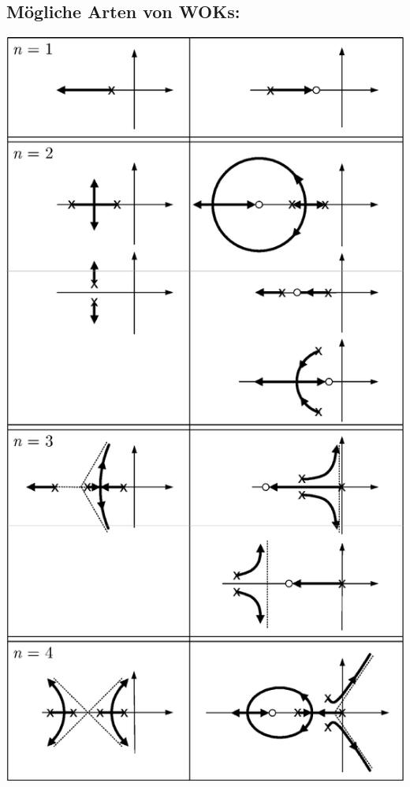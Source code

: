 \documentclass[fs, footer]{latex4ei}
\begin{document}
\begin{multicols*}{4}
\subsection{Mögliche Arten von WOKs:}
\includegraphics[width = \columnwidth]{./img/wok_kinds.jpg}

\columnbreak


\end{multicols*}
\end{document}
